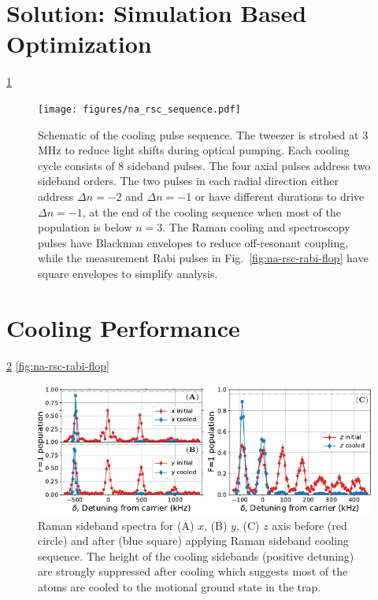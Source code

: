 \section{Solution: Simulation Based Optimization}

\ref{fig:na-rsc-sequence}

\begin{figure}
  \centering
  \texttt{[image: figures/na\_rsc\_sequence.pdf]}
  \caption[Simulation optimized Raman sideband cooling sequence for Sodium]{
    Schematic of the cooling pulse sequence. The tweezer is strobed at 3 MHz to
    reduce light shifts during optical pumping.
    Each cooling cycle consists of $8$ sideband pulses.
    The four axial pulses address two sideband orders.
    The two pulses in each radial direction either address $\Delta n=-2$ and $\Delta n=-1$
    or have different durations to drive $\Delta n=-1$,
    at the end of the cooling sequence when most of the population is below $n=3$.
    The Raman cooling and spectroscopy pulses have Blackman envelopes
    to reduce off-resonant coupling,
    while the measurement Rabi pulses in Fig.~\ref{fig:na-rsc-rabi-flop}
    have square envelopes to simplify analysis.
    \label{fig:na-rsc-sequence}}
\end{figure}

\section{Cooling Performance}

\ref{fig:na-rsc-spectrum}
\ref{fig:na-rsc-rabi-flop}

\begin{figure}
  \centering
  \includegraphics[width=\textwidth]{figures/na_rsc_spectrum.pdf}
  \caption[Raman sideband spectra before and after cooling]{
    Raman sideband spectra for (A) $x$, (B) $y$, (C) $z$ axis before (red circle)
    and after (blue square) applying Raman sideband cooling sequence.
    The height of the cooling sidebands (positive detuning)
    are strongly suppressed after cooling which suggests most of the atoms are cooled
    to the motional ground state in the trap.
    \label{fig:na-rsc-spectrum}}
\end{figure}

